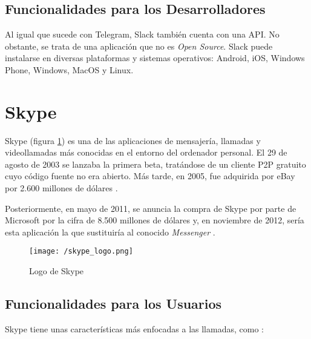 \subsection{Funcionalidades para los Desarrolladores}
Al igual que sucede con Telegram, Slack también cuenta con una \acs{API}. No obstante, se trata de una aplicación que no es \textit{Open Source}. Slack puede instalarse en diversas plataformas y sistemas operativos: Android, iOS, Windows Phone, Windows, MacOS y Linux.

\newpage

\section{Skype}
\label{sec:skype}

Skype (figura \ref{fig:skype}) es una de las aplicaciones de mensajería, llamadas y videollamadas más conocidas en el entorno del ordenador personal.
El 29 de agosto de 2003 se lanzaba la primera beta, tratándose de un cliente \acf{P2P} gratuito cuyo código fuente no era abierto. Más tarde, en 2005, fue adquirida por eBay por 2.600 millones de dólares \cite{Velasco2013}.

Posteriormente, en mayo de 2011, se anuncia la compra de Skype por parte de Microsoft por la cifra de 8.500 millones de dólares y, en noviembre de 2012, sería esta aplicación la que sustituiría al conocido \textit{Messenger} \cite{Ramirez2013}.

\begin{figure}[!h]
	\begin{center}
		\texttt{[image: /skype\_logo.png]}
		\caption{Logo de Skype}
		\label{fig:skype}
	\end{center}
\end{figure}

\subsection{Funcionalidades para los Usuarios}
Skype tiene unas características más enfocadas a las llamadas, como \cite{Skype2017}:


